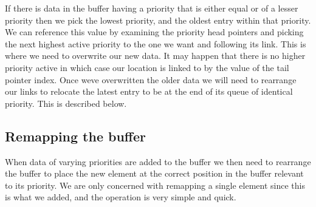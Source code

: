 If there is data in the buffer having a priority that is either equal or of a lesser priority then we pick the lowest priority, and the oldest entry within that priority. We can reference this value by examining the priority head pointers and picking the next highest active priority to the one we want and following its link. This is where we need to overwrite our new data. It may happen that there is no higher priority active in which case our location is linked to by the value of the tail pointer index. Once we\textquotesingle{}ve overwritten the older data we will need to rearrange our links to relocate the latest entry to be at the end of it\textquotesingle{}s queue of identical priority. This is described below.

\subsection*{Remapping the buffer}

When data of varying priorities are added to the buffer we then need to rearrange the buffer to place the new element at the correct position in the buffer relevant to its priority. We are only concerned with remapping a single element since this is what we added, and the operation is very simple and quick. 